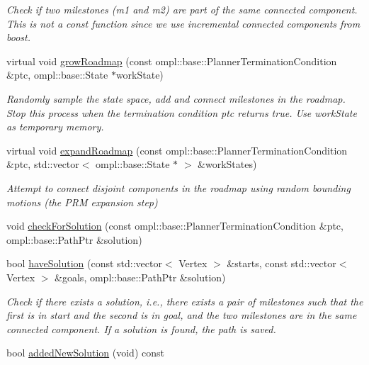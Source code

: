 \begin{DoxyCompactItemize}
\begin{DoxyCompactList}\small\item\em \-Check if two milestones ({\itshape m1\/} and {\itshape m2\/}) are part of the same connected component. \-This is not a const function since we use incremental connected components from boost. \end{DoxyCompactList}\item 
\hypertarget{class_f_i_r_m_a4ffee3e504973b2f2a37b6b40c1cd214}{virtual void \hyperlink{class_f_i_r_m_a4ffee3e504973b2f2a37b6b40c1cd214}{grow\-Roadmap} (const ompl\-::base\-::\-Planner\-Termination\-Condition \&ptc, ompl\-::base\-::\-State $\ast$work\-State)}\label{class_f_i_r_m_a4ffee3e504973b2f2a37b6b40c1cd214}

\begin{DoxyCompactList}\small\item\em \-Randomly sample the state space, add and connect milestones in the roadmap. \-Stop this process when the termination condition {\itshape ptc\/} returns true. \-Use {\itshape work\-State\/} as temporary memory. \end{DoxyCompactList}\item 
\hypertarget{class_f_i_r_m_ab0c4511064a0cd59f5b5ad756879c4ef}{virtual void \hyperlink{class_f_i_r_m_ab0c4511064a0cd59f5b5ad756879c4ef}{expand\-Roadmap} (const ompl\-::base\-::\-Planner\-Termination\-Condition \&ptc, std\-::vector$<$ ompl\-::base\-::\-State $\ast$ $>$ \&work\-States)}\label{class_f_i_r_m_ab0c4511064a0cd59f5b5ad756879c4ef}

\begin{DoxyCompactList}\small\item\em \-Attempt to connect disjoint components in the roadmap using random bounding motions (the \-P\-R\-M expansion step) \end{DoxyCompactList}\item 
void \hyperlink{class_f_i_r_m_a4c909fc53ceeeecb6992ccebf0ab60d6}{check\-For\-Solution} (const ompl\-::base\-::\-Planner\-Termination\-Condition \&ptc, ompl\-::base\-::\-Path\-Ptr \&solution)
\item 
\hypertarget{class_f_i_r_m_ab237fb0d7978ef4156769fc7c1d77b2b}{bool \hyperlink{class_f_i_r_m_ab237fb0d7978ef4156769fc7c1d77b2b}{have\-Solution} (const std\-::vector$<$ \-Vertex $>$ \&starts, const std\-::vector$<$ \-Vertex $>$ \&goals, ompl\-::base\-::\-Path\-Ptr \&solution)}\label{class_f_i_r_m_ab237fb0d7978ef4156769fc7c1d77b2b}

\begin{DoxyCompactList}\small\item\em \-Check if there exists a solution, i.\-e., there exists a pair of milestones such that the first is in {\itshape start\/} and the second is in {\itshape goal\/}, and the two milestones are in the same connected component. \-If a solution is found, the path is saved. \end{DoxyCompactList}\item 
\hypertarget{class_f_i_r_m_a341a81deb4e550fbacf6c239a801d2a8}{bool \hyperlink{class_f_i_r_m_a341a81deb4e550fbacf6c239a801d2a8}{added\-New\-Solution} (void) const }\label{class_f_i_r_m_a341a81deb4e550fbacf6c239a801d2a8}


\end{DoxyCompactItemize}

